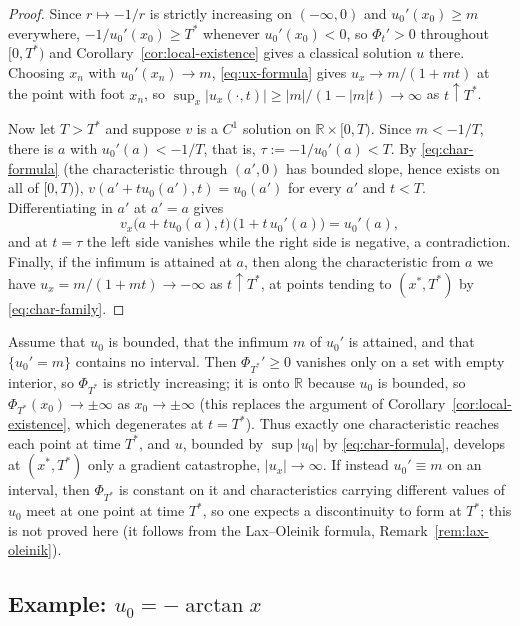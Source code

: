 \begin{proof}
Since $r \mapsto -1/r$ is strictly increasing on $(-\infty,0)$ and
$u_0'(x_0) \geq m$ everywhere, $-1/u_0'(x_0) \geq T^*$ whenever $u_0'(x_0)<0$, so
$\Phi_t'>0$ throughout $[0,T^*)$ and Corollary~\ref{cor:local-existence} gives a
classical solution $u$ there. Choosing $x_n$ with $u_0'(x_n)\to m$,
\eqref{eq:ux-formula} gives $u_x\to m/(1+mt)$ at the point with foot $x_n$, so
$\sup_x|u_x(\cdot,t)|\ge|m|/(1-|m|t)\to\infty$ as $t\uparrow T^*$.

Now let $T>T^*$ and suppose $v$ is a $C^1$ solution on $\mathbb{R}\times[0,T)$.
Since $m<-1/T$, there is $a$ with $u_0'(a)<-1/T$, that is,
$\tau:=-1/u_0'(a)<T$. By \eqref{eq:char-formula} (the characteristic
through $(a',0)$ has bounded slope, hence exists on all of $[0,T)$),
$v(a'+tu_0(a'),t)=u_0(a')$ for every $a'$ and $t<T$. Differentiating in $a'$ at
$a'=a$ gives
\begin{equation*}
  v_x\big(a+tu_0(a),t\big)\,\big(1+t\,u_0'(a)\big)=u_0'(a),
\end{equation*}
and at $t=\tau$ the left side vanishes while the right side is negative, a
contradiction. Finally, if the infimum is attained at $a$, then along the
characteristic from $a$ we have $u_x=m/(1+mt)\to-\infty$ as $t\uparrow T^*$, at
points tending to $(x^*,T^*)$ by \eqref{eq:char-family}.
\end{proof}

\begin{remark}
\label{rem:singularity-vs-shock}
Assume that $u_0$ is bounded, that the infimum $m$ of $u_0'$ is attained, and
that $\{u_0'=m\}$ contains no interval. Then $\Phi_{T^*}'\ge0$ vanishes only on a
set with empty interior, so $\Phi_{T^*}$ is strictly increasing; it is onto
$\mathbb{R}$ because $u_0$ is bounded, so $\Phi_{T^*}(x_0)\to\pm\infty$ as
$x_0\to\pm\infty$ (this replaces the argument of
Corollary~\ref{cor:local-existence}, which degenerates at $t=T^*$). Thus exactly
one characteristic reaches each point at time $T^*$, and $u$, bounded by
$\sup|u_0|$ by \eqref{eq:char-formula}, develops at $(x^*,T^*)$ only a gradient
catastrophe, $|u_x|\to\infty$. If instead $u_0'\equiv m$ on an interval, then
$\Phi_{T^*}$ is constant on it and characteristics carrying different values of
$u_0$ meet at one point at time $T^*$, so one expects a discontinuity to form
at $T^*$; this is not proved here (it follows from the Lax--Oleinik formula,
Remark~\ref{rem:lax-oleinik}).
\end{remark}

\subsection{Example: $u_0=-\arctan x$}
\label{subsec:arctan-breakdown}

